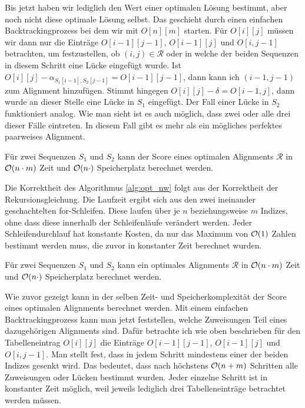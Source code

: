 Bis jetzt haben wir lediglich den Wert einer optimalen Lösung bestimmt, aber noch nicht diese optimale Lösung selbst. Das geschieht durch einen einfachen Backtrackingprozess bei dem wir mit $O[n][m]$ starten. Für $O[i][j]$ müssen wir dann nur die Einträge $O[i-1][j-1]$, $O[i-1][j]$ und $O[i,j-1]$ betrachten, um festzustellen, ob $(i,j) \in \mathcal{R}$ oder in welche der beiden Sequenzen in diesem Schritt eine Lücke eingefügt wurde. Ist $O[i][j] - \alpha_{S_1[i-1],S_2[j-1]} = O[i-1][j-1]$, dann kann ich $(i-1,j-1)$ zum Alignment hinzufügen. Stimmt hingegen $O[i][j] - \delta = O[i-1,j]$, dann wurde an dieser Stelle eine Lücke in $S_1$ eingefügt. Der Fall einer Lücke in $S_2$ funktioniert analog. Wie man sieht ist es auch möglich, dass zwei oder alle drei dieser Fälle eintreten. In diesem Fall gibt es mehr als ein mögliches perfektes paarweises Alignment. 

\begin{lemma}
	Für zwei Sequenzen $S_1$ und $S_2$ kann der Score eines optimalen Alignments $\mathcal{R}$ in $\mathcal{O}(n\cdot m)$ Zeit und $\mathcal{O}(n\cdot)$ Speicherplatz berechnet werden.
\end{lemma}

\begin{beweis}
	Die Korrektheit des Algorithmus \ref{alg:opt_nw} folgt aus der Korrektheit der Rekursionsgleichung. Die Laufzeit ergibt sich aus den zwei ineinander geschachtelten for-Schleifen. Diese laufen über je $n$ beziehungsweise $m$ Indizes, ohne dass diese innerhalb der Schleifenläufe verändert werden. Jeder Schleifendurchlauf hat konstante Kosten, da nur das Maximum von $\mathcal{O}(1)$ Zahlen bestimmt werden muss, die zuvor in konstanter Zeit berechnet wurden.
\end{beweis}

\begin{korollar}
	Für zwei Sequenzen $S_1$ und $S_2$ kann ein optimales Alignments $\mathcal{R}$ in $\mathcal{O}(n\cdot m)$ Zeit und $\mathcal{O}(n\cdot)$ Speicherplatz berechnet werden.
\end{korollar}

\begin{beweis}
	Wie zuvor gezeigt kann in der selben Zeit- und Speicherkomplexität der Score eines optimalen Alignments berechnet werden. Mit einem einfachen Backtrackingprozess kann man jetzt feststellen, welche Zuweisungen Teil eines dazugehörigen Alignments sind. Dafür betrachte ich wie oben beschrieben für den Tabelleneintrag $O[i][j]$ die Einträge  $O[i-1][j-1]$, $O[i-1][j]$ und $O[i,j-1]$. Man stellt fest, dass in jedem Schritt mindestens einer der beiden Indizes gesenkt wird. Das bedeutet, dass nach höchstens $\mathcal{O}(n+m)$ Schritten alle Zuweisungen oder Lücken bestimmt wurden. Jeder einzelne Schritt ist in konstanter Zeit möglich, weil jeweils lediglich drei Tabelleneinträge betrachtet werden müssen. 
\end{beweis}


